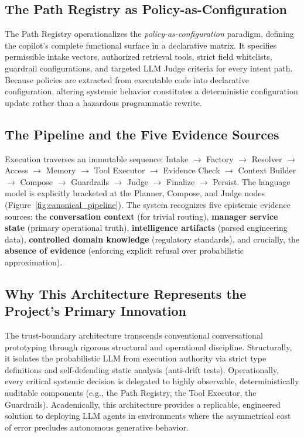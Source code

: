 \subsection{The Path Registry as Policy-as-Configuration}
The Path Registry operationalizes the \textit{policy-as-configuration} paradigm, defining the copilot's complete functional surface in a declarative matrix. It specifies permissible intake vectors, authorized retrieval tools, strict field whitelists, guardrail configurations, and targeted LLM Judge criteria for every intent path. Because policies are extracted from executable code into declarative configuration, altering systemic behavior constitutes a deterministic configuration update rather than a hazardous programmatic rewrite.

\subsection{The Pipeline and the Five Evidence Sources}
Execution traverses an immutable sequence: Intake $\rightarrow$ Factory $\rightarrow$ Resolver $\rightarrow$ Access $\rightarrow$ Memory $\rightarrow$ Tool Executor $\rightarrow$ Evidence Check $\rightarrow$ Context Builder $\rightarrow$ Compose $\rightarrow$ Guardrails $\rightarrow$ Judge $\rightarrow$ Finalize $\rightarrow$ Persist. The language model is explicitly bracketed at the Planner, Compose, and Judge nodes (Figure~\ref{fig:canonical_pipeline}). The system recognizes five epistemic evidence sources: the \textbf{conversation context} (for trivial routing), \textbf{manager service state} (primary operational truth), \textbf{intelligence artifacts} (parsed engineering data), \textbf{controlled domain knowledge} (regulatory standards), and crucially, the \textbf{absence of evidence} (enforcing explicit refusal over probabilistic approximation).

\subsection{Why This Architecture Represents the Project's Primary Innovation}
The trust-boundary architecture transcends conventional conversational prototyping through rigorous structural and operational discipline. Structurally, it isolates the probabilistic LLM from execution authority via strict type definitions and self-defending static analysis (anti-drift tests). Operationally, every critical systemic decision is delegated to highly observable, deterministically auditable components (e.g., the Path Registry, the Tool Executor, the Guardrails). Academically, this architecture provides a replicable, engineered solution to deploying LLM agents in environments where the asymmetrical cost of error precludes autonomous generative behavior.

